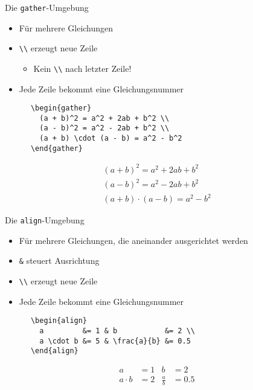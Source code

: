 \begin{frame}[fragile]{Die \texttt{gather}-Umgebung}
  \begin{itemize}
    \item Für mehrere Gleichungen
    \item \verb+\\+ erzeugt neue Zeile
      \begin{itemize}
        \item Kein \verb+\\+ nach letzter Zeile!
      \end{itemize}
    \item Jede Zeile bekommt eine Gleichungsnummer
  \end{itemize}
  \begin{CodeExample}{0.53}
    \begin{lstlisting}
      \begin{gather}
        (a + b)^2 = a^2 + 2ab + b^2 \\
        (a - b)^2 = a^2 - 2ab + b^2 \\
        (a + b) \cdot (a - b) = a^2 - b^2
      \end{gather}
    \end{lstlisting}
  \CodeResult
    \begin{gather}
      (a + b)^2 = a^2 + 2ab + b^2 \\
      (a - b)^2 = a^2 - 2ab + b^2 \\
      (a + b) \cdot (a - b) = a^2 - b^2
    \end{gather}
  \end{CodeExample}
\end{frame}

\begin{frame}[fragile]{Die \texttt{align}-Umgebung}
  \begin{itemize}
    \item Für mehrere Gleichungen, die aneinander ausgerichtet werden
    \item \lstinline+&+ steuert Ausrichtung
    \item \verb+\\+ erzeugt neue Zeile
    \item Jede Zeile bekommt eine Gleichungsnummer
  \end{itemize}
  \begin{CodeExample}{0.65}
    \begin{lstlisting}
      \begin{align}
        a         &= 1 & b           &= 2 \\
        a \cdot b &= 5 & \frac{a}{b} &= 0.5
      \end{align}
    \end{lstlisting}
  \CodeResult
    \begin{align}
      a         &= 1 & b           &= 2 \\
      a \cdot b &= 2 & \frac{a}{b} &= 0.5
    \end{align}
  \end{CodeExample}
\end{frame}

